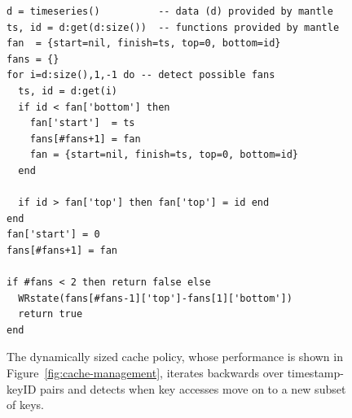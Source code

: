 \begin{figure}[h]
\footnotesize
\begin{verbatim}
d = timeseries()          -- data (d) provided by mantle
ts, id = d:get(d:size())  -- functions provided by mantle
fan  = {start=nil, finish=ts, top=0, bottom=id}
fans = {}
for i=d:size(),1,-1 do -- detect possible fans
  ts, id = d:get(i)
  if id < fan['bottom'] then
    fan['start']  = ts
    fans[#fans+1] = fan 
    fan = {start=nil, finish=ts, top=0, bottom=id}
  end 

  if id > fan['top'] then fan['top'] = id end 
end
fan['start'] = 0 
fans[#fans+1] = fan 

if #fans < 2 then return false else
  WRstate(fans[#fans-1]['top']-fans[1]['bottom'])
  return true
end
\end{verbatim}
\caption{The dynamically sized cache policy, whose performance is shown in 
Figure~\ref{fig:cache-management}, iterates backwards over timestamp-keyID pairs
and detects when key accesses move on to a new subset of
keys.\label{src:dyn-cache}}
\end{figure}

